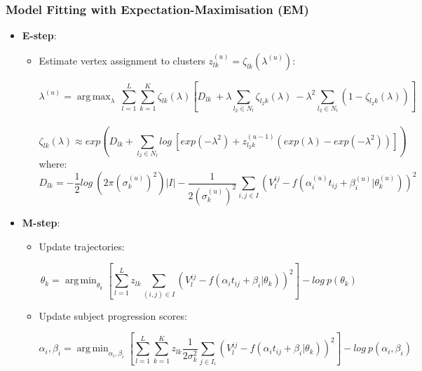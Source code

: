 \documentclass[8pt,xcolor=table,aspectratio=169]{beamer}
\DeclareMathOperator*{\argmin}{arg\,min}
\DeclareMathOperator*{\argmax}{arg\,max}
\begin{document}
\begin{frame}[label=current]
\frametitle{Model Fitting with Expectation-Maximisation (EM)}


    \vspace{-4em}
    \begin{itemize}
    \item \textbf{E-step}:
    \begin{itemize}
    \item Estimate vertex assignment to clusters $z_{lk}^{(u)} = \zeta_{lk}(\lambda^{(u)})$:
     
    $$ \lambda^{(u)} = \argmax_{\lambda}\ \sum_{l=1}^L \sum_{k=1}^K \zeta_{lk}(\lambda) \left[  D_{lk} \  + \lambda \sum_{l_2 \in N_l}  \zeta_{l_2 k}(\lambda)\  -\lambda^2 \sum_{l_2 \in N_l} (1- \zeta_{l_2 k}(\lambda))  \right]$$\\
    $$    \zeta_{lk}(\lambda) \approx exp \left( D_{lk} +   \sum_{l_2 \in N_l} log\ \left[ exp(-\lambda^2) + z_{l_2k}^{(u-1)} (exp(\lambda) - exp(-\lambda^2)) \right] \right) $$
    where:
    $$ D_{lk} = -\frac{1}{2}log\ (2 \pi \left(\sigma_k^{(u)}\right)^2) |I| - \frac{1}{2\left(\sigma_k^{(u)}\right)^2} \sum_{i,j \in I} (V_l^{ij} - f(\alpha_i^{(u)} t_{ij} + \beta_i^{(u)} | \theta_k^{(u)}))^2$$
        
    \end{itemize}
    \item \textbf{M-step}:
    \begin{itemize}
     \item Update trajectories:
     
     \begin{equation}
 \label{eq:theta}
 \theta_k = \argmin_{\theta_k} \left[\sum_{l=1}^L z_{lk} \sum_{(i,j) \in I} (V_l^{ij} - f(\alpha_i t_{ij} + \beta_i | \theta_k))^2 \right] - log\ p(\theta_k) 
\end{equation}
     
     \item Update subject progression scores:
     
     \begin{equation}
\label{eq:alpha}
 \alpha_i, \beta_i = \argmin_{\alpha_i, \beta_i}  \left[ \sum_{l=1}^L \sum_{k=1}^K z_{lk} \frac{1}{2\sigma_k^2} \sum_{j \in I_i} (V_l^{ij} - f(\alpha_i t_{ij} + \beta_i | \theta_k))^2\right] - log\ p(\alpha_i, \beta_i)
\end{equation}
     
    \end{itemize}
    \end{itemize}
\vspace{-3em}
    
\end{frame}
\end{document}

